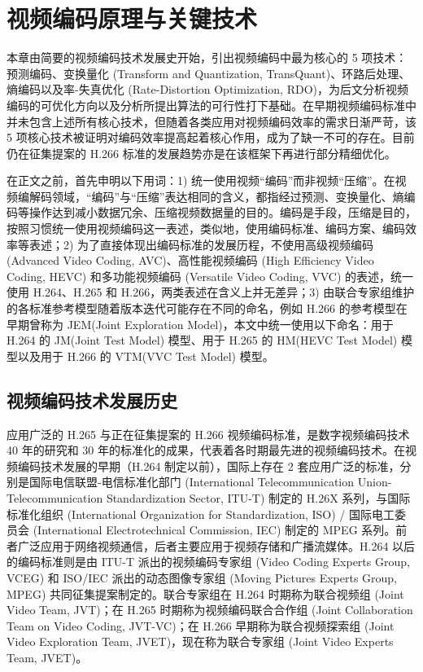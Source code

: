 \chapter{视频编码原理与关键技术}
\label{cha:c2}
本章由简要的视频编码技术发展史开始，引出视频编码中最为核心的 5 项技术：预测编码、变换量化 (Transform and Quantization, TransQuant)、环路后处理、熵编码以及率-失真优化 (Rate-Distortion Optimization, RDO)，为后文分析视频编码的可优化方向以及分析所提出算法的可行性打下基础。在早期视频编码标准中并未包含上述所有核心技术，但随着各类应用对视频编码效率的需求日渐严苛，该 5 项核心技术被证明对编码效率提高起着核心作用，成为了缺一不可的存在。目前仍在征集提案的 H.266 标准的发展趋势亦是在该框架下再进行部分精细优化。

在正文之前，首先申明以下用词：1) 统一使用视频“编码”而非视频“压缩”。在视频编解码领域，“编码”与“压缩”表达相同的含义，都指经过预测、变换量化、熵编码等操作达到减小数据冗余、压缩视频数据量的目的。编码是手段，压缩是目的，按照习惯统一使用视频编码这一表述，类似地，使用编码标准、编码方案、编码效率等表述；2) 为了直接体现出编码标准的发展历程，不使用高级视频编码 (Advanced Video Coding, AVC)、高性能视频编码 (High Efficiency Video Coding, HEVC) 和多功能视频编码 (Versatile Video Coding, VVC) 的表述，统一使用 H.264、H.265 和 H.266，两类表述在含义上并无差异；3) 由联合专家组维护的各标准参考模型随着版本迭代可能存在不同的命名，例如 H.266 的参考模型在早期曾称为 JEM(Joint Exploration Model)，本文中统一使用以下命名：用于 H.264 的 JM(Joint Test Model) 模型、用于 H.265 的 HM(HEVC Test Model) 模型以及用于 H.266 的 VTM(VVC Test Model) 模型。

\section{视频编码技术发展历史}
应用广泛的 H.265 与正在征集提案的 H.266 视频编码标准，是数字视频编码技术 40 年的研究和 30 年的标准化的成果，代表着各时期最先进的视频编码技术。在视频编码技术发展的早期（H.264 制定以前），国际上存在 2 套应用广泛的标准，分别是国际电信联盟-电信标准化部门 (International Telecommunication Union-Telecommunication Standardization Sector, ITU-T) 制定的 H.26X 系列，与国际标准化组织 (International Organization for Standardization, ISO) / 国际电工委员会 (International Electrotechnical Commission, IEC) 制定的 MPEG 系列。前者广泛应用于网络视频通信，后者主要应用于视频存储和广播流媒体。H.264 以后的编码标准则是由 ITU-T 派出的视频编码专家组 (Video Coding Experts Group, VCEG) 和 ISO/IEC 派出的动态图像专家组 (Moving Pictures Experts Group, MPEG) 共同征集提案制定的。联合专家组在 H.264 时期称为联合视频组 (Joint Video Team, JVT)；在 H.265 时期称为视频编码联合合作组 (Joint Collaboration Team on Video Coding, JVT-VC)；在 H.266 早期称为联合视频探索组 (Joint Video Exploration Team, JVET)，现在称为联合专家组 (Joint Video Experts Team, JVET)。


